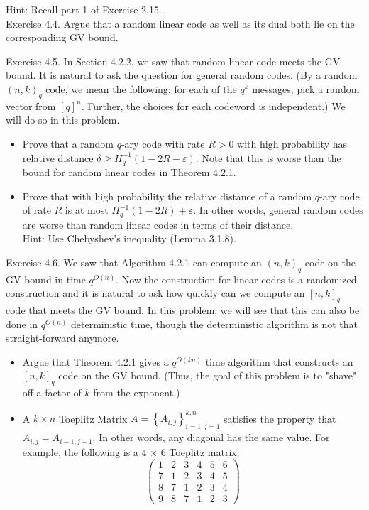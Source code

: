 \documentclass[10pt]{article}
\begin{document}
Hint: Recall part 1 of Exercise 2.15.\\
Exercise 4.4. Argue that a random linear code as well as its dual both lie on the corresponding GV bound.

Exercise 4.5. In Section 4.2.2, we saw that random linear code meets the GV bound. It is natural to ask the question for general random codes. (By a random $(n, k)_{q}$ code, we mean the following: for each of the $q^{k}$ messages, pick a random vector from $[q]^{n}$. Further, the choices for each codeword is independent.) We will do so in this problem.

\begin{itemize}
  \item[1.] Prove that a random $q$-ary code with rate $R>0$ with high probability has relative distance $\delta \geq H_{q}^{-1}(1-2 R-\varepsilon)$. Note that this is worse than the bound for random linear codes in Theorem 4.2.1.
  \item[2.] Prove that with high probability the relative distance of a random $q$-ary code of rate $R$ is at most $H_{q}^{-1}(1-2 R)+\varepsilon$. In other words, general random codes are worse than random linear codes in terms of their distance.\\
Hint: Use Chebyshev's inequality (Lemma 3.1.8).
\end{itemize}

Exercise 4.6. We saw that Algorithm 4.2.1 can compute an $(n, k)_{q}$ code on the GV bound in time $q^{O(n)}$. Now the construction for linear codes is a randomized construction and it is natural to ask how quickly can we compute an $[n, k]_{q}$ code that meets the GV bound. In this problem, we will see that this can also be done in $q^{O(n)}$ deterministic time, though the deterministic algorithm is not that straight-forward anymore.

\begin{itemize}
  \item[1.] Argue that Theorem 4.2.1 gives a $q^{O(k n)}$ time algorithm that constructs an $[n, k]_{q}$ code on the GV bound. (Thus, the goal of this problem is to "shave" off a factor of $k$ from the exponent.)
  \item[2.] A $k \times n$ Toeplitz Matrix $A=\left\{A_{i, j}\right\}_{i=1, j=1}^{k, n}$ satisfies the property that $A_{i, j}=A_{i-1, j-1}$. In other words, any diagonal has the same value. For example, the following is a 4 × 6 Toeplitz matrix:
$$
\left(\begin{array}{llllll}
1 & 2 & 3 & 4 & 5 & 6 \\
7 & 1 & 2 & 3 & 4 & 5 \\
8 & 7 & 1 & 2 & 3 & 4 \\
9 & 8 & 7 & 1 & 2 & 3
\end{array}\right)
$$
\end{itemize}
\end{document}
